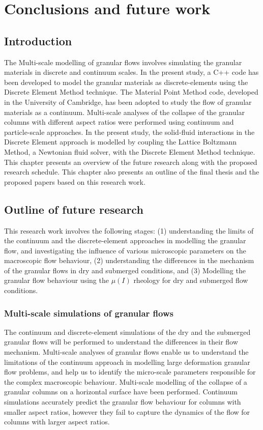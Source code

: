 \chapter{Conclusions and future work}

\ifpdf
    \graphicspath{{Chapter7/figs/raster/}{Chapter7/figs/pdf/}{Chapter7/figs/}}
\else
    \graphicspath{{Chapter7/figs/vector/}{Chapter7/figs/}}
\fi
\section{Introduction}
The Multi-scale modelling of granular flows 
involves simulating the granular 
materials in discrete and continuum scales. In 
the present study, a C++ code 
has been developed to model the granular 
materials as discrete-elements using 
the Discrete Element Method technique. The 
Material Point Method code, 
developed in 
the University of Cambridge, has been adopted to 
study the flow of granular 
materials as a continuum. Multi-scale analyses 
of the collapse of the granular columns with 
different aspect ratios were 
performed using continuum and particle-scale 
approaches. In the present study, 
the solid-fluid interactions in the Discrete 
Element approach is modelled by 
coupling the Lattice Boltzmann Method, a 
Newtonian fluid solver, with the 
Discrete Element Method technique. This chapter 
presents an overview of the 
future 
research along with the proposed research 
schedule. This chapter also presents 
an outline of the final thesis and the proposed 
papers based on this research 
work. 


\section{Outline of future research}
This research work involves the following stages: 
(1) understanding the limits 
of the continuum and the discrete-element 
approaches in modelling the granular 
flow, and investigating the influence of various 
microscopic parameters on the 
macroscopic flow behaviour, (2) understanding the 
differences in the mechanism 
of the granular flows in dry and submerged 
conditions, and (3) Modelling the 
granular flow behaviour using the $\mu(I)$ 
rheology for dry and submerged flow 
conditions.

\subsection{Multi-scale simulations of granular 
flows}
The continuum and discrete-element simulations of 
the dry and the submerged 
granular flows will be performed to understand 
the differences in their flow 
mechanism. Multi-scale analyses of granular flows 
enable us to understand the 
limitations of the continuum approach in 
modelling large deformation granular 
flow problems, and help us to identify the 
micro-scale parameters responsible 
for the complex macroscopic behaviour. 
Multi-scale modelling of the collapse of 
a granular columns on a horizontal surface have 
been performed. Continuum 
simulations accurately predict the granular flow 
behaviour for columns with 
smaller aspect ratios, however they fail to 
capture the dynamics of the flow 
for columns with larger aspect ratios. 

